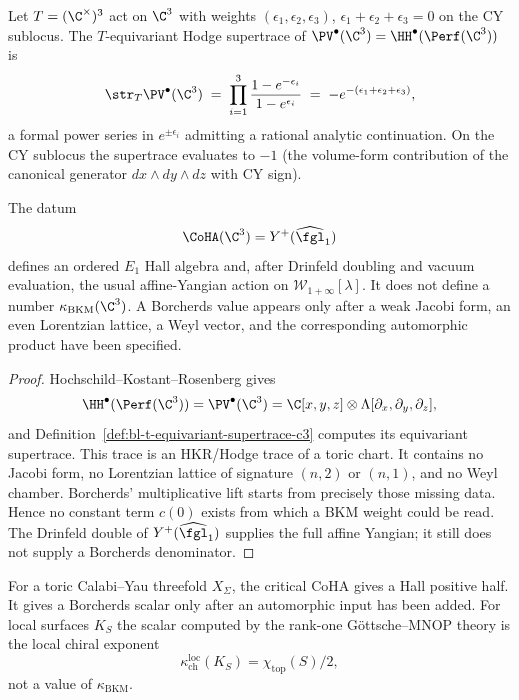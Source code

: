 \begin{definition}
\label{def:bl-t-equivariant-supertrace-c3}
Let $T = (\C^\times)^3$ act on $\C^3$ with weights $(\epsilon_1, \epsilon_2, \epsilon_3)$, $\epsilon_1 + \epsilon_2 + \epsilon_3 = 0$ on the CY sublocus. The $T$-equivariant Hodge supertrace of $\PV^\bullet(\C^3) = \HH^\bullet(\Perf(\C^3))$ is
\[
 \str_T \PV^\bullet(\C^3)
 \;=\; \prod_{i = 1}^{3} \frac{1 - e^{-\epsilon_i}}{1 - e^{\epsilon_i}}
 \;=\; -e^{-(\epsilon_1 + \epsilon_2 + \epsilon_3)},
\]
a formal power series in $e^{\pm \epsilon_i}$ admitting a rational analytic continuation. On the CY sublocus the supertrace evaluates to $-1$ (the volume-form contribution of the canonical generator $dx \wedge dy \wedge dz$ with CY sign).
\end{definition}

\begin{theorem}
\label{thm:bl-hodge-c3-base-case}
The datum
\[
 \CoHA(\C^3)=Y^+(\widehat{\fgl}_1)
\]
defines an ordered $E_1$ Hall algebra and, after Drinfeld doubling and vacuum evaluation, the usual affine-Yangian action on $\mathcal W_{1+\infty}[\lambda]$. It does not define a number $\kappa_{\mathrm{BKM}}(\C^3)$. A Borcherds value appears only after a weak Jacobi form, an even Lorentzian lattice, a Weyl vector, and the corresponding automorphic product have been specified.
\end{theorem}

\begin{proof}
Hochschild--Kostant--Rosenberg gives
\[
 \HH^\bullet(\Perf(\C^3))=\PV^\bullet(\C^3)
 =\C[x,y,z]\otimes\Lambda[\partial_x,\partial_y,\partial_z],
\]
and Definition~\ref{def:bl-t-equivariant-supertrace-c3} computes its equivariant supertrace. This trace is an HKR/Hodge trace of a toric chart. It contains no Jacobi form, no Lorentzian lattice of signature $(n,2)$ or $(n,1)$, and no Weyl chamber. Borcherds' multiplicative lift starts from precisely those missing data. Hence no constant term $c(0)$ exists from which a BKM weight could be read. The Drinfeld double of $Y^+(\widehat{\fgl}_1)$ supplies the full affine Yangian; it still does not supply a Borcherds denominator.
\end{proof}

\begin{proposition}
\label{prop:bl-stratum-i-toric-degenerate}
For a toric Calabi--Yau threefold $X_\Sigma$, the critical CoHA gives a Hall positive half. It gives a Borcherds scalar only after an automorphic input has been added. For local surfaces $K_S$ the scalar computed by the rank-one G\"ottsche--MNOP theory is the local chiral exponent
\[
 \kappa_{\mathrm{ch}}^{\mathrm{loc}}(K_S)=\chi_{\mathrm{top}}(S)/2,
\]
not a value of $\kappa_{\mathrm{BKM}}$.
\end{proposition}

